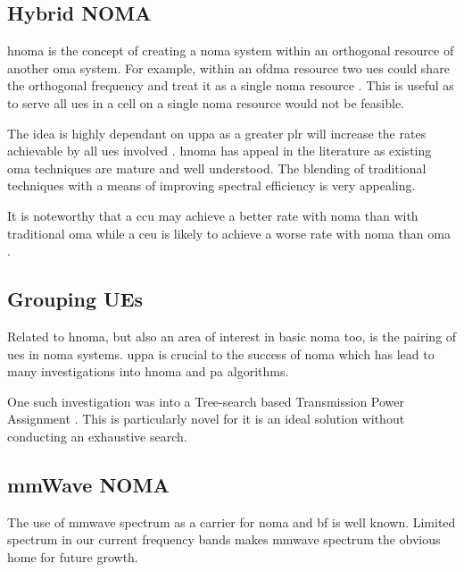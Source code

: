 \subsection{Hybrid NOMA}
\label{sec:hnoma}
\ac{hnoma} is the concept of creating a \ac{noma} system within an orthogonal resource of another \ac{oma} system.
For example, within an \ac{ofdma} resource two \acp{ue} could share the orthogonal frequency and treat it as a single \ac{noma} resource \cite{ding:2017}.
This is useful as to serve all \acp{ue} in a cell on a single \ac{noma} resource would not be feasible.

\par
The idea is highly dependant on \ac{uppa} as a greater \ac{plr} will increase the rates achievable by all \acp{ue} involved \cite{ding:2016}.
\ac{hnoma} has appeal in the literature as existing \ac{oma} techniques are mature and well understood.
The blending of traditional techniques with a means of improving spectral efficiency is very appealing.

\par
It is noteworthy that a \ac{ccu} may achieve a better rate with \ac{noma} than with traditional \ac{oma} while a \ac{ceu} is likely to achieve a worse rate with \ac{noma} than \ac{oma} \cite{ding:2017}.

\subsection{Grouping UEs}

\par
Related to \ac{hnoma}, but also an area of interest in basic \ac{noma} too, is the pairing of \acp{ue} in \ac{noma} systems.
\ac{uppa} is crucial to the success of \ac{noma} which has lead to many investigations into \ac{hnoma} and \ac{pa} algorithms.

\par
One such investigation was into a Tree-search based Transmission Power Assignment \cite{li:2014}.
This is particularly novel for it is an ideal solution without conducting an exhaustive search.

\subsection{mmWave NOMA}
The use of \ac{mmwave} spectrum as a carrier for \ac{noma} and \acl{bf} is well known.
Limited spectrum in our current frequency bands makes \ac{mmwave} spectrum the obvious home for future growth.

